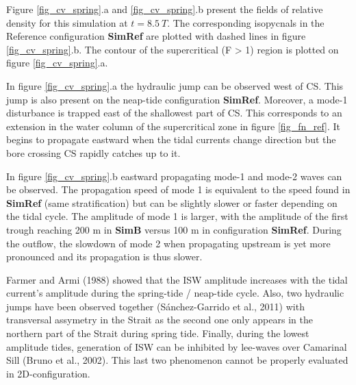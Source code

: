 \documentclass[a4paper,12pt]{article}
\begin{document}
Figure \ref{fig_cv_spring}.a and \ref{fig_cv_spring}.b present the fields of relative density for this simulation at $t = 8.5\ T$. The corresponding isopycnals in the Reference configuration \textbf{SimRef} are plotted with dashed lines in figure \ref{fig_cv_spring}.b. The contour of the supercritical (F > 1) region is plotted on figure \ref{fig_cv_spring}.a.

In figure \ref{fig_cv_spring}.a the hydraulic jump can be observed west of CS. This jump is also present on the neap-tide configuration \textbf{SimRef}. Moreover, a mode-1 disturbance is trapped east of the shallowest part of CS. This corresponds to an extension in the water column of the supercritical zone in figure \ref{fig_fn_ref}. It begins to propagate eastward when the tidal currents change direction but the bore crossing CS rapidly catches up to it.

In figure \ref{fig_cv_spring}.b eastward propagating mode-1 and mode-2 waves can be observed. The propagation speed of mode 1 is equivalent to the speed found in \textbf{SimRef} (same stratification) but can be slightly slower or faster depending on the tidal cycle. The amplitude of mode 1 is larger, with the amplitude of the first trough reaching 200 m in \textbf{SimB} versus 100 m in configuration \textbf{SimRef}\color{black}. During the outflow, the slowdown of mode 2 when propagating upstream is yet more pronounced and its propagation is thus slower.

Farmer and Armi (1988) showed that the ISW amplitude increases with the tidal current's amplitude during the spring-tide / neap-tide cycle. Also, two hydraulic jumps have been observed together (S\'anchez-Garrido et al., 2011) with transversal assymetry in the Strait as the second one only appears in the northern part of the Strait during spring tide. Finally, during the lowest amplitude tides, generation of ISW can be inhibited by lee-waves over Camarinal Sill (Bruno et al., 2002). This last two phenomenon cannot be properly evaluated in 2D-configuration. 
\end{document}
